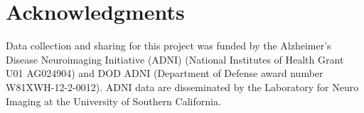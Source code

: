 \documentclass{article}
\begin{document}
 
\section*{Acknowledgments} 
 
Data collection and sharing for this project was funded by the Alzheimer's Disease Neuroimaging Initiative (ADNI) (National Institutes of Health Grant U01 AG024904) and DOD ADNI (Department of Defense award number W81XWH-12-2-0012). ADNI data are disseminated by the Laboratory for Neuro Imaging at the University of Southern California.



\end{document}
